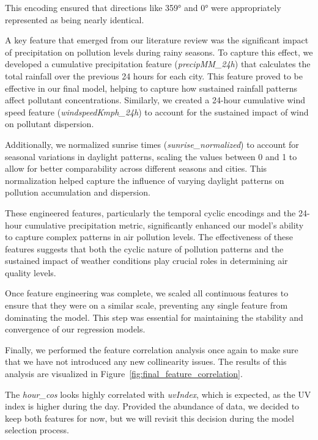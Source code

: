 \documentclass[twoside,11pt]{article}
\begin{document}
This encoding ensured that directions like 359° and 0° were appropriately represented as being nearly identical.

A key feature that emerged from our literature review was the significant impact of precipitation on pollution levels during rainy seasons. To capture this effect, we developed a cumulative precipitation feature (\textit{precipMM\_24h}) that calculates the total rainfall over the previous 24 hours for each city. This feature proved to be effective in our final model, helping to capture how sustained rainfall patterns affect pollutant concentrations. Similarly, we created a 24-hour cumulative wind speed feature (\textit{windspeedKmph\_24h}) to account for the sustained impact of wind on pollutant dispersion.

Additionally, we normalized sunrise times (\textit{sunrise\_normalized}) to account for seasonal variations in daylight patterns, scaling the values between 0 and 1 to allow for better comparability across different seasons and cities. This normalization helped capture the influence of varying daylight patterns on pollution accumulation and dispersion.

These engineered features, particularly the temporal cyclic encodings and the 24-hour cumulative precipitation metric, significantly enhanced our model's ability to capture complex patterns in air pollution levels. The effectiveness of these features suggests that both the cyclic nature of pollution patterns and the sustained impact of weather conditions play crucial roles in determining air quality levels.

Once feature engineering was complete, we scaled all continuous features to ensure that they were on a similar scale, preventing any single feature from dominating the model. This step was essential for maintaining the stability and convergence of our regression models.

Finally, we performed the feature correlation analysis once again to make sure that we have not introduced any new collinearity issues. The results of this analysis are visualized in Figure~\ref{fig:final_feature_correlation}.

The \textit{hour\_cos} looks highly correlated with \textit{uvIndex}, which is expected, as the UV index is higher during the day. Provided the abundance of data, we decided to keep both features for now, but we will revisit this decision during the model selection process.
\end{document}
